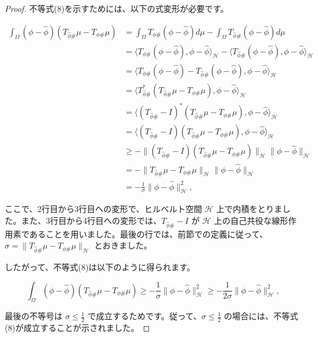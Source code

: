 \documentclass{jsarticle}
\theoremstyle{definition}
\begin{document}
\color{gray}
\begin{proof}
  
不等式(8)を示すためには、以下の式変形が必要です。

$$
\begin{aligned}
\int_\Omega (\phi - \hat{\phi})(T_{\hat{\phi} \#} \mu - T_{\phi \#} \mu) &= \int_\Omega T_{\phi \#}(\phi - \hat{\phi}) d\mu - \int_\Omega T_{\hat{\phi} \#}(\phi - \hat{\phi}) d\mu \\
&= \langle T_{\phi \#}(\phi - \hat{\phi}), \phi - \hat{\phi} \rangle_{\mathcal{H}} - \langle T_{\hat{\phi} \#}(\phi - \hat{\phi}), \phi - \hat{\phi} \rangle_{\mathcal{H}} \\
&= \langle T_{\phi \#}(\phi - \hat{\phi}) - T_{\hat{\phi} \#}(\phi - \hat{\phi}), \phi - \hat{\phi} \rangle_{\mathcal{H}} \\
&= \langle T_{\hat{\phi} \#}^*(T_{\hat{\phi} \#} \mu - T_{\phi \#} \mu), \phi - \hat{\phi} \rangle_{\mathcal{H}} \\
&= \langle (T_{\hat{\phi} \#} - I)^*(T_{\hat{\phi} \#} \mu - T_{\phi \#} \mu), \phi - \hat{\phi} \rangle_{\mathcal{H}} \\
&= \langle (T_{\hat{\phi} \#} - I)(T_{\hat{\phi} \#} \mu - T_{\phi \#} \mu), \phi - \hat{\phi} \rangle_{\mathcal{H}} \\
&\geq - \|(T_{\hat{\phi} \#} - I)(T_{\hat{\phi} \#} \mu - T_{\phi \#} \mu)\|_{\mathcal{H}} \|\phi - \hat{\phi}\|_{\mathcal{H}} \\
&= - \|T_{\hat{\phi} \#} \mu - T_{\phi \#} \mu\|_{\mathcal{H}} \|\phi - \hat{\phi}\|_{\mathcal{H}} \\
&= - \frac{1}{\sigma} \|\phi - \hat{\phi}\|_{\mathcal{H}}^2,
\end{aligned}
$$

ここで、2行目から3行目への変形で、ヒルベルト空間 $\mathcal{H}$ 上で内積をとりました。また、3行目から4行目への変形では、$T_{\hat{\phi} \#} - I$ が $\mathcal{H}$ 上の自己共役な線形作用素であることを用いました。最後の行では、前節での定義に従って、$\sigma = \|T_{\hat{\phi} \#} \mu - T_{\phi \#} \mu\|_{\mathcal{H}}$ とおきました。

したがって、不等式(8)は以下のように得られます。

$$
\int_\Omega (\phi - \hat{\phi})(T_{\hat{\phi} \#} \mu - T_{\phi \#} \mu) \geq - \frac{1}{\sigma} \|\phi - \hat{\phi}\|_{\mathcal{H}}^2 \geq - \frac{1}{2\sigma} \|\phi - \hat{\phi}\|_{\mathcal{H}}^2,
$$

最後の不等号は $\sigma \leq \frac{1}{2}$ で成立するためです。従って、$\sigma \leq \frac{1}{2}$ の場合には、不等式(8)が成立することが示されました。



\end{proof}
\end{document}

